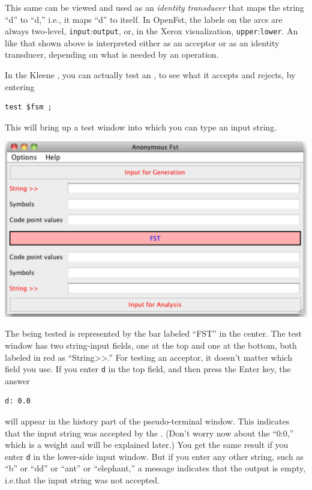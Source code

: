 This same \fsm{} can be viewed and used as an \emph{identity transducer} that maps the string
``d'' to ``d,'' i.e.\@, it maps ``d'' to itself.  In OpenFst, the labels on the arcs are always
two-level, \texttt{input}:\texttt{output}, or, in the Xerox visualization,
\texttt{upper}:\texttt{lower}.  An \fsm{} like that shown above is interpreted either as an acceptor
or as an identity transducer, depending on what is needed by an operation.

In the Kleene , you can actually test an \fsm{}, to see what it accepts and rejects, by entering

\begin{Verbatim}
test $fsm ;
\end{Verbatim}

\noindent
This will bring up a test window into which you can type an input string.


\begin{center}
\includegraphics[width=135mm]{images/testWindow.pdf}
\end{center}

\noindent
The \fst{} being tested
is represented by the bar labeled ``FST'' in the center.
The test window has two string-input fields, one at the top and one at
the bottom, both labeled in red as
``String>\hspace{0pt}>.''  For testing
an acceptor, it doesn't matter which field you use.  If you enter \texttt{d} in the top 
field, and then press the Enter key, the answer 


\begin{Verbatim}
d: 0.0
\end{Verbatim}

\noindent
will appear in the history part
of the pseudo-terminal window.  This indicates that the input string was accepted
by the \fsm{}.  (Don't worry now
about the ``0:0,'' which is a weight and will be explained later.)
You get the same result if you enter \texttt{d} in the
lower-side input window.  But if you enter any other string, such as ``b'' or
``dd'' or ``ant'' or ``elephant,'' a message
indicates that the output is empty, i.e.\@ that the input string was not
accepted.


